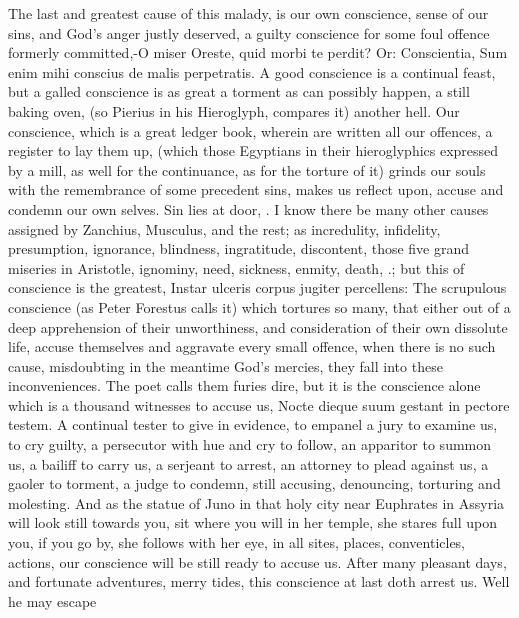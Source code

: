 {The last and greatest cause of this malady, is our own conscience,
sense of our sins, and God's anger justly deserved, a guilty conscience
for some foul offence formerly committed,-O miser Oreste, quid
morbi te perdit? Or: Conscientia, Sum enim mihi conscius de malis
perpetratis. A good conscience is a continual feast, but a galled
conscience is as great a torment as can possibly happen, a still baking
oven, (so Pierius in his Hieroglyph, compares it) another hell. Our
conscience, which is a great ledger book, wherein are written all our
offences, a register to lay them up, (which those Egyptians in
their hieroglyphics expressed by a mill, as well for the continuance,
as for the torture of it) grinds our souls with the remembrance of some
precedent sins, makes us reflect upon, accuse and condemn our own
selves. Sin lies at door, \etc{}. I know there be many other causes
assigned by Zanchius, Musculus, and the rest; as incredulity,
infidelity, presumption, ignorance, blindness, ingratitude, discontent,
those five grand miseries in Aristotle, ignominy, need, sickness,
enmity, death, \etc{}.; but this of conscience is the greatest,
Instar ulceris corpus jugiter percellens: The scrupulous
conscience (as Peter Forestus calls it) which tortures so many,
that either out of a deep apprehension of their unworthiness, and
consideration of their own dissolute life, accuse themselves and
aggravate every small offence, when there is no such cause, misdoubting
in the meantime God's mercies, they fall into these inconveniences. The
poet calls them furies dire, but it is the conscience alone which
is a thousand witnesses to accuse us,  Nocte dieque suum gestant
in pectore testem. A continual tester to give in evidence, to empanel a
jury to examine us, to cry guilty, a persecutor with hue and cry to
follow, an apparitor to summon us, a bailiff to carry us, a serjeant to
arrest, an attorney to plead against us, a gaoler to torment, a judge
to condemn, still accusing, denouncing, torturing and molesting. And as
the statue of Juno in that holy city near Euphrates in Assyria
will look still towards you, sit where you will in her temple, she
stares full upon you, if you go by, she follows with her eye, in all
sites, places, conventicles, actions, our conscience will be still
ready to accuse us. After many pleasant days, and fortunate adventures,
merry tides, this conscience at last doth arrest us. Well he may escape
}
